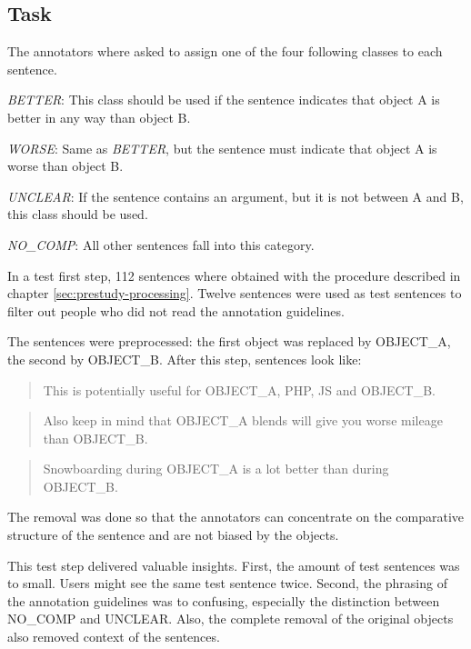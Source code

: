 \subsection{Task}
The annotators where asked to assign one of the four following classes to each sentence.\newline

\emph{BETTER}: This class should be used if the sentence indicates that object A is better in any way than object B.

\emph{WORSE}: Same as \emph{BETTER}, but the sentence must indicate that object A is worse than object B.

\emph{UNCLEAR}: If the sentence contains an argument, but it is not between A and B, this class should be used.

\emph{NO\_COMP}: All other sentences fall into this category.\newline

In a test first step, 112 sentences where obtained with the procedure described in chapter \ref{sec:prestudy-processing}.
Twelve sentences were used as test sentences to filter out people who did not read the annotation guidelines.

The sentences were preprocessed: the first object was replaced by OBJECT\_A, the second by OBJECT\_B. After this step, sentences look like:
\begin{quotation}
This is potentially useful for OBJECT\_A, PHP, JS and OBJECT\_B.
\end{quotation}

\begin{quotation}
Also keep in mind that OBJECT\_A blends will give you worse mileage than OBJECT\_B.
\end{quotation}

\begin{quotation}
Snowboarding during OBJECT\_A is a lot better than during OBJECT\_B.
\end{quotation}

The removal was done so that the annotators can concentrate on the comparative structure of the sentence and are not biased by the objects.

This test step delivered valuable insights. First, the amount of test sentences was to small. Users might see the same test sentence twice. Second, the phrasing of the annotation guidelines was to confusing, especially the distinction between NO\_COMP and UNCLEAR.
Also, the complete removal of the original objects also removed context of the sentences.\newline

